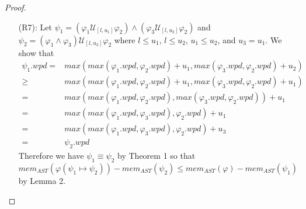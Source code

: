 \documentclass{article}
\begin{document}
\begin{proof}
\begin{enumerate}
Next, using Lemma 1 we see that $mem_{node}(\Box_{[a,a]}{}) = mem_{node}(\mathcal{U}_{[l+a,u+a]}{})$ since $\psi_1.bpd = min(\varphi.bpd,\psi.bpd) + l+a = min(\varphi.bpd+l+a,\psi.bpd+l+a) = \psi_2.bpd$. Then
\begin{align*}
mem_{AST}(\varphi(\psi_1 \mapsto \psi_2)) = & (mem_{AST}(\varphi(\psi_1 \mapsto \psi_2)) - mem_{AST}(\psi_2)) + mem_{AST}(\psi_2) \\
= & (mem_{AST}(\varphi(\psi_1 \mapsto \psi_2)) - mem_{AST}(\psi_2)) + \\
& \qquad \qquad mem_{node}(\mathcal{U}_{[l+a,u+a]}{}) + mem_{AST}(\varphi) + mem_{AST}(\psi) \\
\leq & (mem_{AST}(\varphi) - mem_{AST}(\psi_1)) + \\
& \qquad \qquad mem_{node}(\mathcal{U}_{[l+a,u+a]}{}) + mem_{AST}(\varphi) + mem_{AST}(\psi) \\
= & (mem_{AST}(\varphi) - mem_{AST}(\psi_1)) + \\
& \qquad \qquad mem_{node}(\Box_{[a,a]}{}) + mem_{AST}(\varphi) + mem_{AST}(\psi) \\
\leq & (mem_{AST}(\varphi) - mem_{AST}(\psi_1)) + mem_{node}(\Box_{[a,a]}{}) + \\
& \qquad \qquad mem_{node}(\mathcal{U}_{[l,u]}{}) + mem_{AST}(\varphi) + mem_{AST}(\psi) \\
= & (mem_{AST}(\varphi) - mem_{AST}(\psi_1)) + mem_{AST}(\psi_1) \\
= & mem_{AST}(\varphi)
\end{align*}

The proof follows for ${(\Box_{[a,a]}{\varphi})}\mathcal{U}_{[l,u]}{(\Box_{[a,a]}{\psi})} \rightarrow {\varphi}\mathcal{U}_{[l+a,u+a]}{\psi} $. 

    \item[(R7):]Let $\psi_1 = ({\varphi_1}\mathcal{U}_{[l,u_1]}{\varphi_2}) \land ({\varphi_3}\mathcal{U}_{[l,u_2]}{\varphi_2})$ and $\psi_2 = {(\varphi_1 \land \varphi_3)}\mathcal{U}_{[l,u_3]}{\varphi_2}$ where $l \leq u_1$, $l \leq u_2$, $u_1 \leq u_2$, and $u_3 = u_1$.
We show that 
\begin{align*}
\psi_1.wpd = & max(max(\varphi_1.wpd,\varphi_2.wpd) + u_1, max(\varphi_3.wpd,\varphi_2.wpd) + u_2) \\
\geq & max(max(\varphi_1.wpd,\varphi_2.wpd) + u_1, max(\varphi_3.wpd,\varphi_2.wpd) + u_1) \\
= & max(max(\varphi_1.wpd,\varphi_2.wpd), max(\varphi_3.wpd,\varphi_2.wpd)) + u_1 \\
= & max(max(\varphi_1.wpd,\varphi_3.wpd),\varphi_2.wpd) + u_1 \\
= & max(max(\varphi_1.wpd,\varphi_3.wpd),\varphi_2.wpd) + u_3 \\
= & \psi_2.wpd
\end{align*}
Therefore we have $\psi_1 \equiv \psi_2$ by Theorem 1 so that $mem_{AST}(\varphi(\psi_1 \mapsto \psi_2)) - mem_{AST}(\psi_2)  \leq mem_{AST}(\varphi) - mem_{AST}(\psi_1)$ by Lemma 2.


\end{enumerate}
\end{proof}
\end{document}
